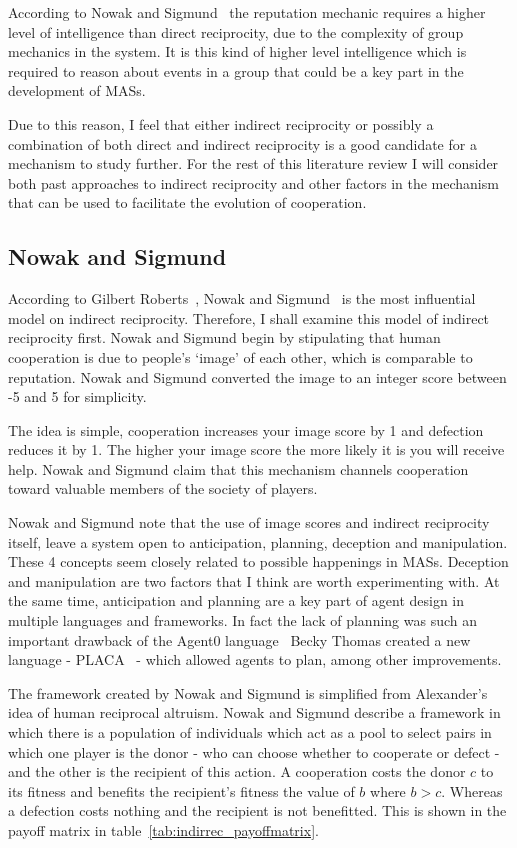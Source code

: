 \documentclass[]{final_report}
\begin{document}
According to Nowak and Sigmund~\cite{evol_indirect_image} the reputation mechanic requires a higher level of intelligence than direct reciprocity, due to the complexity of group mechanics in the system. It is this kind of higher level intelligence which is required to reason about events in a group that could be a key part in the development of MASs.\par
Due to this reason, I feel that either indirect reciprocity or possibly a combination of both direct and indirect reciprocity is a good candidate for a mechanism to study further. For the rest of this literature review I will consider both past approaches to indirect reciprocity and other factors in the mechanism that can be used to facilitate the evolution of cooperation.


\subsection{Nowak and Sigmund}
\label{sec:nowak_sig}
According to Gilbert Roberts~\cite{evoldirindir}, Nowak and Sigmund~\cite{evol_indirect_image} is the most influential model on indirect reciprocity. Therefore, I shall examine this model of indirect reciprocity first. Nowak and Sigmund begin by stipulating that human cooperation is due to people's `image' of each other, which is comparable to reputation. Nowak and Sigmund converted the image to an integer score between -5 and 5 for simplicity.\par
The idea is simple, cooperation increases your image score by 1 and defection reduces it by 1. The higher your image score the more likely it is you will receive help. Nowak and Sigmund claim that this mechanism channels cooperation toward valuable members of the society of players.\par
Nowak and Sigmund note that the use of image scores and indirect reciprocity itself, leave a system open to anticipation, planning, deception and manipulation. These 4 concepts seem closely related to possible happenings in MASs. Deception and manipulation are two factors that I think are worth experimenting with. At the same time, anticipation and planning are a key part of agent design in multiple languages and frameworks. In fact the lack of planning was such an important drawback of the Agent0 language~\cite{shoham1991agent0} Becky Thomas created a new language - PLACA~\cite{thomas1993placa} - which allowed agents to plan, among other improvements.\par
The framework created by Nowak and Sigmund is simplified from Alexander's~\cite{alexander1987biology} idea of human reciprocal altruism. Nowak and Sigmund describe a framework in which there is a population of individuals which act as a pool to select pairs in which one player is the donor - who can choose whether to cooperate or defect - and the other is the recipient of this action. A cooperation costs the donor $c$ to its fitness and benefits the recipient's fitness the value of $b$ where $b>c$. Whereas a defection costs nothing and the recipient is not benefitted. This is shown in the payoff matrix in table~\ref{tab:indirrec_payoffmatrix}.\par
\end{document}
